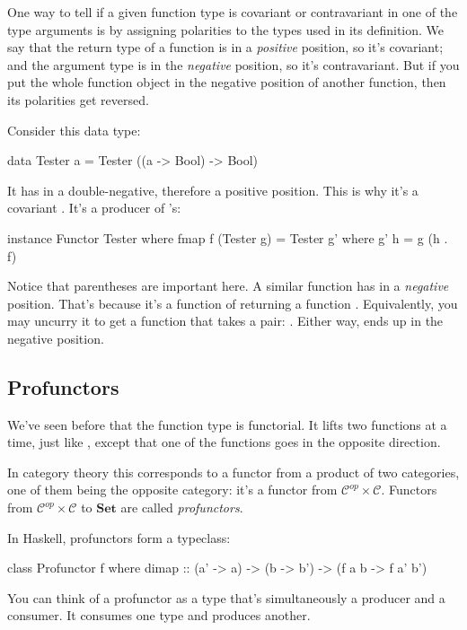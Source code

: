 \documentclass[DaoFP]{subfiles}
\begin{document}
One way to tell if a given function type is covariant or contravariant in one of the type arguments is by assigning polarities to the types used in its definition. We say that the return type of a function is in a \emph{positive} position, so it's covariant; and the argument type is in the \emph{negative} position, so it's contravariant. But if you put the whole function object in the negative position of another function, then its polarities get reversed. 

Consider this data type:
\begin{haskell}
data Tester a = Tester ((a -> Bool) -> Bool)
\end{haskell}
It has  in a double-negative, therefore a positive position. This is why it's a covariant . It's a producer of 's:

\begin{haskell}
instance Functor Tester where
  fmap f (Tester g) = Tester g'
    where g' h = g (h . f)
\end{haskell}

Notice that parentheses are important here. A similar function  has  in a \emph{negative} position. That's because it's a function of  returning a function . Equivalently, you may uncurry it to get a function that takes a pair: . Either way,  ends up in the negative position.

\subsection{Profunctors}

We've seen before that the function type is functorial. It lifts two functions at a time, just like , except that one of the functions goes in the opposite direction. 

In category theory this corresponds to a functor from a product of two categories, one of them being the opposite category: it's a functor from $\mathcal{C}^{op} \times \mathcal{C}$. Functors from $\mathcal{C}^{op} \times \mathcal{C}$ to $\mathbf{Set}$ are called \emph{profunctors}.

In Haskell, profunctors form a typeclass:
\begin{haskell}
class Profunctor f where
  dimap :: (a' -> a) -> (b -> b') -> (f a b -> f a' b')
\end{haskell}

You can think of a profunctor as a type that's simultaneously a producer and a consumer. It consumes one type and produces another.
\end{document}
